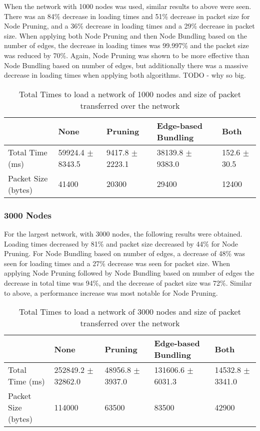 \documentclass[../dissertation.tex]{subfiles}
\begin{document}
When the network with 1000 nodes was used, similar results to above were seen. There was an 84\% decrease in loading times and 51\% decrease in packet size for Node Pruning, and a 36\% decrease in loading times and a 29\% decrease in packet size. When applying both Node Pruning and then Node Bundling based on the number of edges, the decrease in loading times was 99.997\% and the packet size was reduced by 70\%. Again, Node Pruning was shown to be more effective than Node Bundling based on number of edges, but additionally there was a massive decrease in loading times when applying both algorithms. TODO - why so big.

\begin{table}[H]
\centering
\begin{tabular}{|l|l|l|l|l|}
\hline
                    & \textbf{None}        & \textbf{Pruning}    & \textbf{Edge-based Bundling}        & \textbf{Both}    \\ \hline
Total Time (ms)     & 59924.4 $\pm$ 8343.5 & 9417.8 $\pm$ 2223.1 & 38139.8 $\pm$ 9383.0 & 152.6 $\pm$ 30.5 \\ \hline
Packet Size (bytes) & 41400                & 20300               & 29400                & 12400            \\ \hline
\end{tabular}
\caption{Total Times to load a network of 1000 nodes and size of packet transferred over the network}
\label{table:1000-nodes}
\end{table}

\subsubsection{3000 Nodes}

For the largest network, with 3000 nodes, the following results were obtained. Loading times decreased by 81\% and packet size decreased by 44\% for Node Pruning. For Node Bundling based on number of edges, a decrease of 48\% was seen for loading times and a 27\% decrease was seen for packet size. When applying Node Pruning followed by Node Bundling based on number of edges the decrease in total time was 94\%, and the decrease of packet size was 72\%. Similar to above, a performance increase was most notable for Node Pruning. 

\begin{table}[H]
\centering
\begin{tabular}{|l|l|l|l|l|}
\hline
                    & \textbf{None}          & \textbf{Pruning}     & \textbf{Edge-based Bundling}         & \textbf{Both}        \\ \hline
Total Time (ms)     & 252849.2 $\pm$ 32862.0 & 48956.8 $\pm$ 3937.0 & 131606.6 $\pm$ 6031.3 & 14532.8 $\pm$ 3341.0 \\ \hline
Packet Size (bytes) & 114000                 & 63500                & 83500                 & 42900                \\ \hline
\end{tabular}
\caption{Total Times to load a network of 3000 nodes and size of packet transferred over the network}
\label{table:3000-nodes}
\end{table}
\end{document}
